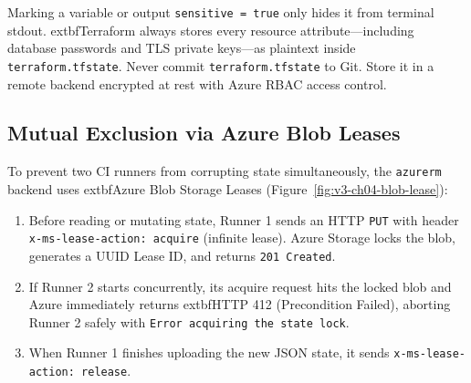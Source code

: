\begin{productionwarningbox}
Marking a variable or output \texttt{sensitive = true} only hides it from terminal stdout. 	extbf{Terraform always stores every resource attribute—including database passwords and TLS private keys—as plaintext inside \texttt{terraform.tfstate}.} Never commit \texttt{terraform.tfstate} to Git. Store it in a remote backend encrypted at rest with Azure RBAC access control.
\end{productionwarningbox}

\subsection{Mutual Exclusion via Azure Blob Leases}
To prevent two CI runners from corrupting state simultaneously, the \texttt{azurerm} backend uses 	extbf{Azure Blob Storage Leases} (Figure~\ref{fig:v3-ch04-blob-lease}):
\begin{enumerate}[leftmargin=15pt]
  \item Before reading or mutating state, Runner 1 sends an HTTP \texttt{PUT} with header \texttt{x-ms-lease-action: acquire} (infinite lease). Azure Storage locks the blob, generates a UUID Lease ID, and returns \texttt{201 Created}.
  \item If Runner 2 starts concurrently, its acquire request hits the locked blob and Azure immediately returns 	extbf{HTTP 412 (Precondition Failed)}, aborting Runner 2 safely with \texttt{Error acquiring the state lock}.
  \item When Runner 1 finishes uploading the new JSON state, it sends \texttt{x-ms-lease-action: release}.
\end{enumerate}

